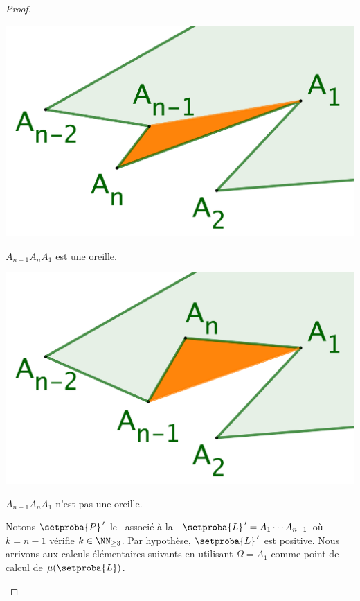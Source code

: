 \begin{proof}
\begin{itemize}
	    \begin{multicols}{2}
    	    \small\itshape
    		\begin{center}
        	\includegraphics[scale=.4]{content/polygon/sufficient-cond/triangulation-proof-OK.png}
        
	        	\smallskip
    	   		$A_{n-1} A_n A_1$ est une oreille.
    	\end{center}
	
	    	\begin{center}
        	\includegraphics[scale=.4]{content/polygon/sufficient-cond/triangulation-proof-KO.png}
        
        		\smallskip
    	   		$A_{n-1} A_n A_1$ n'est pas une oreille.
    		\end{center}
    	\end{multicols}
		
		
		\noindent
		Notons $\setproba{P}^{\,\prime}$ le \kgone\ associé à la \kline\ $\setproba{L}^{\,\prime} = A_1 \cdots A_{n-1}$ où $k = n-1$ vérifie $k \in \NN_{\geq3}$. Par hypothèse, $\setproba{L}^{\,\prime}$ est positive. Nous arrivons aux calculs élémentaires suivants en utilisant $\Omega = A_1$ comme point de calcul de $\mu(\setproba{L})$.


\end{itemize}
\end{proof}
